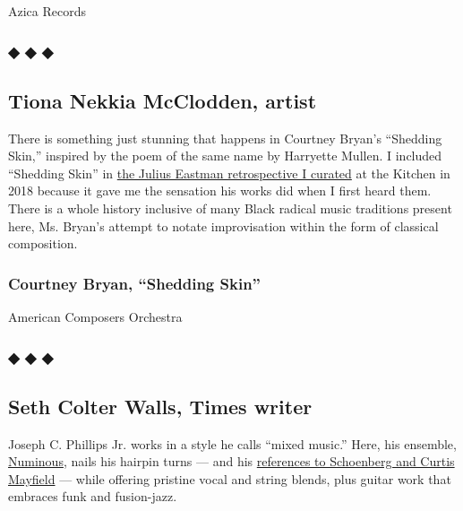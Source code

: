 Azica Records

\hypertarget{---3}{%
\subsubsection{◆ ◆ ◆}\label{---3}}

\hypertarget{tiona-nekkia-mcclodden-artist}{%
\subsection{Tiona Nekkia McClodden,
artist}\label{tiona-nekkia-mcclodden-artist}}

There is something just stunning that happens in Courtney Bryan's
``Shedding Skin,'' inspired by the poem of the same name by Harryette
Mullen. I included ``Shedding Skin'' in
\href{https://thekitchen.org/event/julius-eastman-that-which-is-fundamental}{the
Julius Eastman retrospective I curated} at the Kitchen in 2018 because
it gave me the sensation his works did when I first heard them. There is
a whole history inclusive of many Black radical music traditions present
here, Ms. Bryan's attempt to notate improvisation within the form of
classical composition.

\hypertarget{courtney-bryan-shedding-skin}{%
\subsubsection{Courtney Bryan, ``Shedding
Skin''}\label{courtney-bryan-shedding-skin}}

American Composers Orchestra

\hypertarget{---4}{%
\subsubsection{◆ ◆ ◆}\label{---4}}

\hypertarget{seth-colter-walls-times-writer}{%
\subsection{Seth Colter Walls, Times
writer}\label{seth-colter-walls-times-writer}}

Joseph C. Phillips Jr. works in a style he calls ``mixed music.'' Here,
his ensemble,
\href{https://numinous.bandcamp.com/album/changing-same-2}{Numinous},
nails his hairpin turns --- and his
\href{https://www.numinousmusic.com/uploads/5/0/4/9/50499401/19_joseph_c_phillips_jr_from_thesis__final_.pdf}{references
to Schoenberg and Curtis Mayfield} --- while offering pristine vocal and
string blends, plus guitar work that embraces funk and fusion-jazz.

